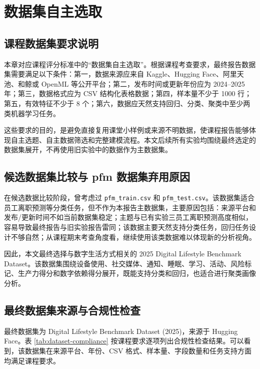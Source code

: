 \chapter{数据集自主选取}

\section{课程数据集要求说明}

本章对应课程评分标准中的“数据集自主选取”。根据课程考查要求，最终报告数据集需要满足以下条件：第一，数据来源应来自 Kaggle、Hugging Face、阿里天池、和鲸或 OpenML 等公开平台；第二，发布时间或更新年份应为 2024--2025 年；第三，数据格式应为 CSV 结构化表格数据；第四，样本量不少于 1000 行；第五，有效特征不少于 8 个；第六，数据应天然支持回归、分类、聚类中至少两类机器学习任务。

这些要求的目的，是避免直接复用课堂小样例或来源不明数据，使课程报告能够体现自主选题、自主数据筛选和完整建模流程。本文后续所有实验均围绕最终选定的数据集展开，不再使用旧实验中的数据作为主数据集。

\section{候选数据集比较与 pfm 数据集弃用原因}

在候选数据比较阶段，曾考虑过 \texttt{pfm\_train.csv} 和 \texttt{pfm\_test.csv}。该数据集适合员工离职预测等分类任务，但不作为本报告主数据集，主要原因包括：来源平台和发布/更新时间不如当前数据集稳定；主题与已有实验三员工离职预测高度相似，容易导致最终报告与旧实验报告雷同；该数据主要天然支持分类任务，回归任务设计不够自然；从课程期末考查角度看，继续使用该类数据难以体现新的分析视角。

因此，本文最终选择与数字生活方式相关的 2025 Digital Lifestyle Benchmark Dataset。该数据集围绕设备使用、社交媒体、通知、睡眠、学习、活动、风险标记、生产力得分和数字依赖得分展开，既能支持分类和回归，也适合进行聚类画像分析。

\section{最终数据集来源与合规性检查}

最终数据集为 Digital Lifestyle Benchmark Dataset (2025)，来源于 Hugging Face。表 \ref{tab:dataset-compliance} 按课程要求逐项列出合规性检查结果。可以看到，该数据集在来源平台、年份、CSV 格式、样本量、字段数量和任务支持方面均满足课程要求。



